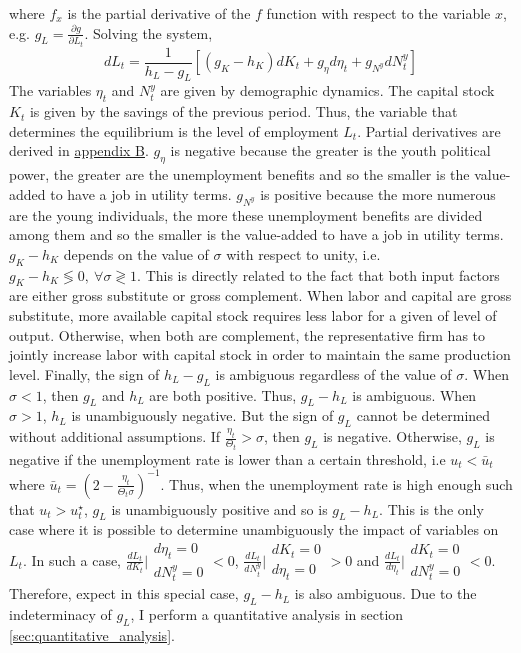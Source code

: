 where $f_x$ is the partial derivative of the $f$ function with respect to the variable $x$, e.g. $g_L = \frac{\partial g}{\partial L_t}$. Solving the system,
\begin{equation*}
	dL_t = \frac{1}{h_L-g_L}\left[(g_K-h_K) dK_t + g_\eta d\eta_t + g_{N^y} dN_t^y \right]
\end{equation*}
The variables $\eta_t$ and $N_t^y$ are given by demographic dynamics. The capital stock $K_t$ is given by the savings of the previous period. Thus, the variable that determines the equilibrium is the level of employment $L_t$. Partial derivatives are derived in \hyperref[appendix:derivatives]{appendix B}. $g_\eta$ is negative because the greater is the youth political power, the greater are the unemployment benefits and so the smaller is the value-added to have a job in utility terms. $g_{N^y}$ is positive because the more numerous are the young individuals, the more these unemployment benefits are divided among them and so the smaller is the value-added to have a job in utility terms. $g_K-h_K$ depends on the value of $\sigma$ with respect to unity, i.e. $g_K-h_K \lessgtr 0, ~ \forall \sigma \gtrless 1$. This is directly related to the fact that both input factors are either gross substitute or gross complement. When labor and capital are gross substitute, more available capital stock requires less labor for a given of level of output. Otherwise, when both are complement, the representative firm has to jointly increase labor with capital stock in order to maintain the same production level. Finally, the sign of $h_L-g_L$ is ambiguous regardless of the value of $\sigma$. When $\sigma < 1$, then $g_L$ and $h_L$ are both positive. Thus, $g_L-h_L$ is ambiguous. When $\sigma > 1$, $h_L$ is unambiguously negative. But the sign of $g_L$ cannot be determined without additional assumptions. If $\frac{\eta_t}{\Theta_t} > \sigma$, then $g_L$ is negative. Otherwise, $g_L$ is negative if the unemployment rate is lower than a certain threshold, i.e $u_t < \bar{u}_t$ where $\bar{u}_t = \left(2 - \frac{\eta_t}{\Theta_t\sigma}\right)^{-1}$. Thus, when the unemployment rate is high enough such that $u_t > u_t^\star$, $g_L$ is unambiguously positive and so is $g_L-h_L$. This is the only case where it is possible to determine unambiguously the impact of variables on $L_t$. In such a case, $\frac{dL_t}{dK_t}\Bigr|{\substack{d\eta_t = 0\\dN_t^y = 0}} < 0$, $\frac{dL_t}{dN^y_t}\Bigr|{\substack{dK_t = 0\\d\eta_t = 0}} > 0$ and $\frac{dL_t}{d\eta_t}\Bigr|{\substack{dK_t = 0\\dN_t^y = 0}} < 0$. Therefore, expect in this special case, $g_L-h_L$ is also ambiguous. Due to the indeterminacy of $g_L$, I perform a quantitative analysis in section \ref{sec:quantitative_analysis}.


